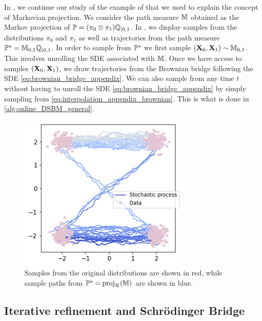 \documentclass{article}
\begin{document}
In , we continue our study of the example of \citep{liu2022rectified} that we used to explain the concept of Markovian projection. We consider the path measure $\mathbb{M}$ obtained as the Markov projection of $\mathbb{P} = (\pi_0 \otimes \pi_1) \mathbb{Q}_{|0,1}$. In , we display samples from the distributions $\pi_0$ and $\pi_1$ as well as trajectories from the path measure $\mathbb{P}^\star = \mathbb{M}_{0,1} \mathbb{Q}_{|0,1}$. In order to sample from $\mathbb{P}^\star$ we first sample $(\mathbf{X}_0, \mathbf{X}_1) \sim \mathbb{M}_{0,1}$. This involves unrolling the SDE associated with $\mathbb{M}$. Once we have access to samples $(\mathbf{X}_0, \mathbf{X}_1)$, we draw trajectories from the Brownian bridge following the SDE \eqref{eq:brownian_bridge_appendix}. We can also sample from any time $t$ without having to unroll the SDE \eqref{eq:brownian_bridge_appendix} by simply sampling from \eqref{eq:interpolation_appendix_brownian}. This is what is done in \cref{alg:online_DSBM_general}.

\begin{figure}[H]
    \centering
    \includegraphics[width=.4\linewidth]{img/reciprocal_projection.png}
    \caption{Samples from the original distributions are shown in red, while sample paths from $\mathbb{P}^\star = \mathrm{proj}_{\mathcal{R}}(\mathbb{M})$ are shown in blue.}
    \label{fig:reciprocal_projection}
\end{figure}


\subsection{Iterative refinement and Schr\"odinger Bridge}
\label{sec:lit_dsbm_appendix}
\end{document}
